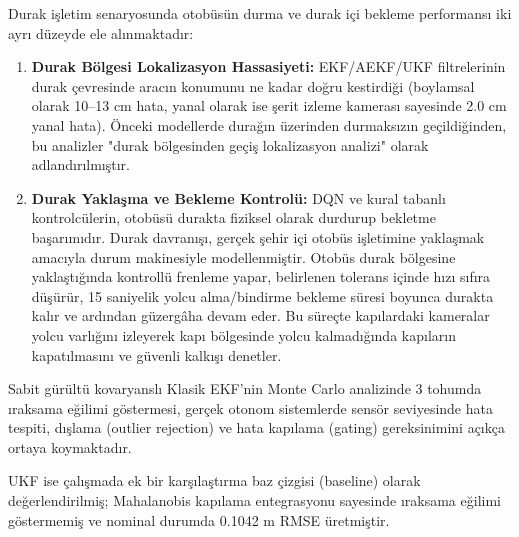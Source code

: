 ﻿\documentclass[conference]{IEEEtran}
\begin{document}
Durak işletim senaryosunda otobüsün durma ve durak içi bekleme performansı iki ayrı düzeyde ele alınmaktadır:
\begin{enumerate}
    \item \textbf{Durak Bölgesi Lokalizasyon Hassasiyeti:} EKF/AEKF/UKF filtrelerinin durak çevresinde aracın konumunu ne kadar doğru kestirdiği (boylamsal olarak 10--13 cm hata, yanal olarak ise şerit izleme kamerası sayesinde 2.0 cm yanal hata). Önceki modellerde durağın üzerinden durmaksızın geçildiğinden, bu analizler "durak bölgesinden geçiş lokalizasyon analizi" olarak adlandırılmıştır.
    \item \textbf{Durak Yaklaşma ve Bekleme Kontrolü:} DQN ve kural tabanlı kontrolcülerin, otobüsü durakta fiziksel olarak durdurup bekletme başarımıdır. Durak davranışı, gerçek şehir içi otobüs işletimine yaklaşmak amacıyla durum makinesiyle modellenmiştir. Otobüs durak bölgesine yaklaştığında kontrollü frenleme yapar, belirlenen tolerans içinde hızı sıfıra düşürür, 15 saniyelik yolcu alma/bindirme bekleme süresi boyunca durakta kalır ve ardından güzergâha devam eder. Bu süreçte kapılardaki kameralar yolcu varlığını izleyerek kapı bölgesinde yolcu kalmadığında kapıların kapatılmasını ve güvenli kalkışı denetler.
\end{enumerate}

Sabit gürültü kovaryanslı Klasik EKF'nin Monte Carlo analizinde 3 tohumda ıraksama eğilimi göstermesi, gerçek otonom sistemlerde sensör seviyesinde hata tespiti, dışlama (outlier rejection) ve hata kapılama (gating) gereksinimini açıkça ortaya koymaktadır.

UKF ise çalışmada ek bir karşılaştırma baz çizgisi (baseline) olarak değerlendirilmiş; Mahalanobis kapılama entegrasyonu sayesinde ıraksama eğilimi göstermemiş ve nominal durumda 0.1042 m RMSE üretmiştir.
\end{document}
